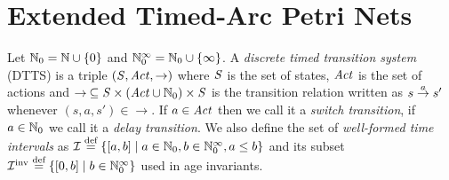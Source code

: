 \section{Extended Timed-Arc Petri Nets} \label{sec:def}
Let $\mathbb{N}_{0} = \mathbb{N} \cup \{0\}$ and 
$\mathbb{N}_{0}^{\infty} = \mathbb{N}_{0} \cup \left\{\infty \right\}$.
A \emph{discrete timed transition system} (DTTS) 
is a triple $\left(\mathit{S}, \mathit{Act},\rightarrow\right)$
where $\mathit{S}$ is the set of states, $\mathit{Act}$ is the set of actions
and $\rightarrow\: \subseteq \mathit{S} \times (\mathit{Act} \cup \mathbb{N}_{0})  \times \mathit{S}$ is the 
transition relation written as $s \stackrel{a}{\rightarrow} s'$ whenever $(s,a,s') \in \rightarrow$.
If $a \in \mathit{Act}$ then we call it a \emph{switch transition}, if
$a \in \mathbb{N}_{0}$ we call it a \emph{delay transition}.
We also define the set of \emph{well-formed time intervals} as 
$\mathcal{I} \stackrel{\textrm{def}}{=} \{[a,b] \mid a \in \mathbb{N}_{0},b\in \mathbb{N}_{0}^{\infty}, a\leq b \}$
and its subset $\mathcal{I}^{\text{inv}} \stackrel{\textrm{def}}{=} \{[0,b] \mid b\in \mathbb{N}_{0}^{\infty} \}$
used in age invariants. 


